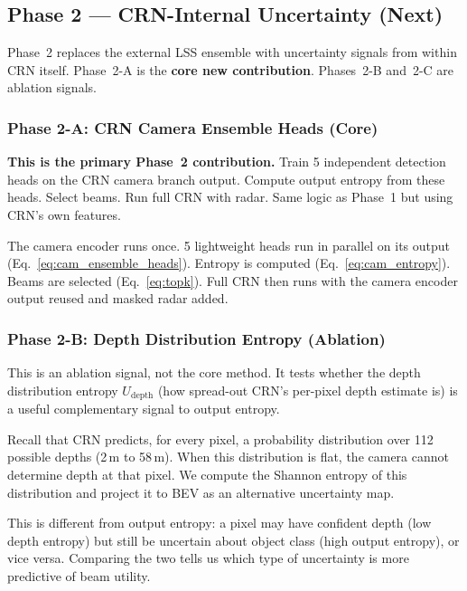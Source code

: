 \documentclass[12pt, a4paper]{article}
\newcommand{\Udep}{U_{\mathrm{depth}}}
\theoremstyle{definition}
\begin{document}
\subsection{Phase 2 --- CRN-Internal Uncertainty (Next)}
\label{sec:phase2}

\begin{nextbox}
  Phase~2 replaces the external LSS ensemble with uncertainty signals from
  within CRN itself. Phase~2-A is the \textbf{core new contribution}.
  Phases~2-B and~2-C are ablation signals.
\end{nextbox}

\subsubsection{Phase 2-A: CRN Camera Ensemble Heads (Core)}

\begin{corebox}
\textbf{This is the primary Phase~2 contribution.}
Train 5 independent detection heads on the CRN camera branch output.
Compute output entropy from these heads. Select beams. Run full CRN with radar.
Same logic as Phase~1 but using CRN's own features.
\end{corebox}

The camera encoder runs once. 5 lightweight heads run in parallel on its output
(Eq.~\eqref{eq:cam_ensemble_heads}). Entropy is computed (Eq.~\eqref{eq:cam_entropy}).
Beams are selected (Eq.~\eqref{eq:topk}). Full CRN then runs with the
camera encoder output reused and masked radar added.

\subsubsection{Phase 2-B: Depth Distribution Entropy (Ablation)}

\begin{ablationbox}
This is an ablation signal, not the core method.
It tests whether the depth distribution entropy $\Udep$ (how spread-out CRN's
per-pixel depth estimate is) is a useful complementary signal to output entropy.
\end{ablationbox}

\begin{plainbox}
Recall that CRN predicts, for every pixel, a probability distribution over 112
possible depths (2\,m to 58\,m). When this distribution is flat, the camera
cannot determine depth at that pixel. We compute the Shannon entropy of this
distribution and project it to BEV as an alternative uncertainty map.

This is different from output entropy: a pixel may have confident depth
(low depth entropy) but still be uncertain about object class (high output entropy),
or vice versa. Comparing the two tells us which type of uncertainty is more
predictive of beam utility.
\end{plainbox}
\end{document}
